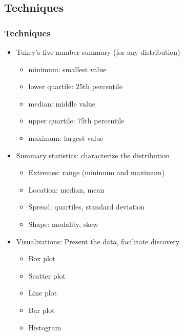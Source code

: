 \documentclass{beamer}
\begin{document}
\subsection{Techniques}
\begin{frame}

\frametitle{Techniques}
\begin{itemize}
\item Tukey's five number summary (for any distribution)
    \begin{itemize}
    \item minimum: smallest value
    \item lower quartile: 25th percentile
    \item median: middle value
    \item upper quartile: 75th percentile
    \item maximum: largest value
    \end{itemize}
\item Summary statistics: characterize the distribution
    \begin{itemize}
    \item Extremes: range (minimum and maximum)
    \item Location: median, mean
    \item Spread: quartiles, standard deviation
    \item Shape: modality, skew
    \end{itemize}
\item Visualizations: Present the data, facilitate discovery
    \begin{itemize}
    \item Box plot
    \item Scatter plot
    \item Line plot
    \item Bar plot
    \item Histogram
    \end{itemize}
\end{itemize}

\end{frame}


\end{document}
